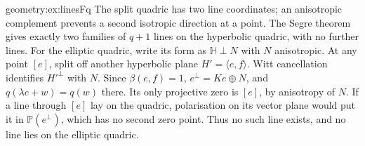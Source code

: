 \begin{solution}{geometry:ex:linesFq}
\idea The split quadric has two line coordinates; an anisotropic complement
prevents a second isotropic direction at a point.
\writeup The Segre theorem gives exactly two families of $q+1$ lines
on the hyperbolic quadric, with no further lines.
For the elliptic quadric, write its form as $\mathbb H\perp N$ with
$N$ anisotropic. At any point $[e]$, split off another hyperbolic plane
$H'=\langle e,f\rangle$. Witt cancellation identifies $H'^\perp$
with $N$. Since $\beta(e,f)=1$,
$e^\perp=Ke\oplus N$, and $q(\lambda e+w)=q(w)$ there.
Its only projective zero is $[e]$, by anisotropy of $N$.
If a line through $[e]$ lay on the quadric, polarisation on its vector
plane would put it in $\mathbb P(e^\perp)$, which has no second zero
point. Thus no such line exists, and no line lies on the elliptic quadric.
\end{solution}
